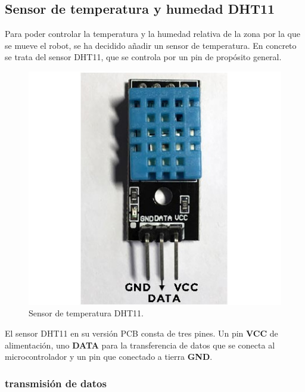 \subsection{Sensor de temperatura y humedad DHT11}
\label{sec:dth11}


Para poder controlar la temperatura y la humedad relativa de la zona por la que se mueve el
robot, se ha decidido añadir un sensor de temperatura. En concreto se trata del sensor DHT11, que
se controla por un pin de propósito general.\\

\begin{figure}[H]
  \begin{center}
    \includegraphics[scale=0.3]{imagenes/dth11.jpg}
  \end{center}
  \caption{Sensor de temperatura DHT11.}
  \label{figura:sensor_dth11}
\end{figure}

El sensor DHT11 en su versión PCB consta de tres pines. Un pin \textbf{VCC} de alimentación, uno \textbf{DATA} para la transferencia de
datos que se conecta al microcontrolador y un pin que conectado a tierra \textbf{GND}.\\

\subsubsection{transmisión de datos}

